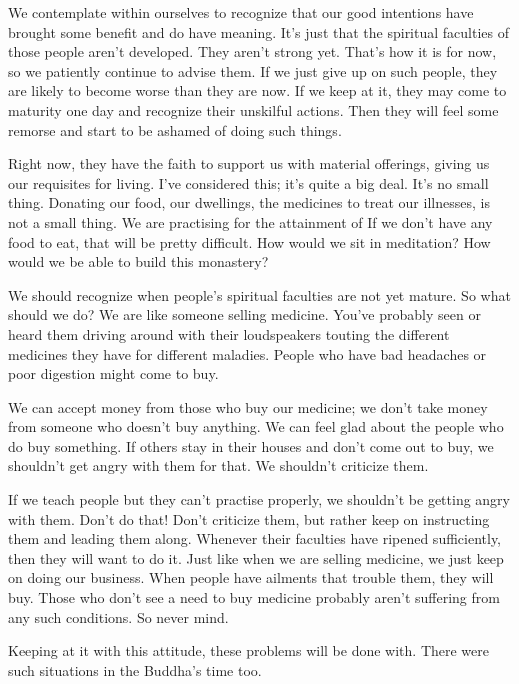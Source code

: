 We contemplate within ourselves to recognize that our good intentions have brought some benefit and do have meaning. It's just that the spiritual faculties of those people aren't developed. They aren't strong yet. That's how it is for now, so we patiently continue to advise them. If we just give up on such people, they are likely to become worse than they are now. If we keep at it, they may come to maturity one day and recognize their unskilful actions. Then they will feel some remorse and start to be ashamed of doing such things.

Right now, they have the faith to support us with material offerings, giving us our requisites for living. I've considered this; it's quite a big deal. It's no small thing. Donating our food, our dwellings, the medicines to treat our illnesses, is not a small thing. We are practising for the attainment of  If we don't have any food to eat, that will be pretty difficult. How would we sit in meditation? How would we be able to build this monastery?

We should recognize when people's spiritual faculties are not yet mature. So what should we do? We are like someone selling medicine. You've probably seen or heard them driving around with their loudspeakers touting the different medicines they have for different maladies. People who have bad headaches or poor digestion might come to buy.

We can accept money from those who buy our medicine; we don't take money from someone who doesn't buy anything. We can feel glad about the people who do buy something. If others stay in their houses and don't come out to buy, we shouldn't get angry with them for that. We shouldn't criticize them.

If we teach people but they can't practise properly, we shouldn't be getting angry with them. Don't do that! Don't criticize them, but rather keep on instructing them and leading them along. Whenever their faculties have ripened sufficiently, then they will want to do it. Just like when we are selling medicine, we just keep on doing our business. When people have ailments that trouble them, they will buy. Those who don't see a need to buy medicine probably aren't suffering from any such conditions. So never mind.

Keeping at it with this attitude, these problems will be done with. There were such situations in the Buddha's time too.

